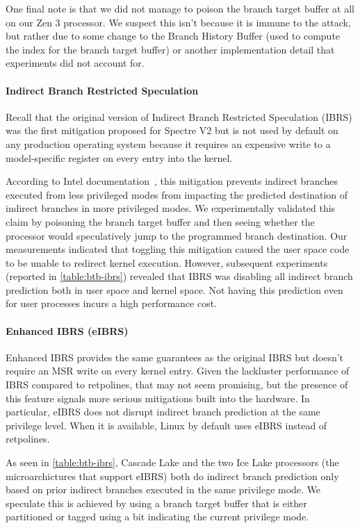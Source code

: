 One final note is that we did not manage to poison the branch target buffer at all on our Zen 3 processor.
We suspect this isn't because it is immune to the attack, but rather due to some change to the Branch History Buffer (used to compute the index for the branch target buffer) or another implementation detail that experiments did not account for.

\paragraph{Indirect Branch Restricted Speculation}

Recall that the original version of Indirect Branch Restricted Speculation (IBRS) was the first mitigation proposed for Spectre V2 but is not used by default on any production operating system because it requires an expensive write to a model-specific register on every entry into the kernel.

According to Intel documentation~\cite{intel:ibrs-ssbd}, this mitigation prevents indirect branches executed from less privileged modes from impacting the predicted destination of indirect branches in more privileged modes.
We experimentally validated this claim by poisoning the branch target buffer and then seeing whether the processor would speculatively jump to the programmed branch destination.
Our measurements indicated that toggling this mitigation caused the
user space code to be unable to redirect kernel execution.
However, subsequent experiments (reported in
\autoref{table:btb-ibrs}) revealed that IBRS was disabling all
indirect branch prediction both in user space and kernel space.
Not having this prediction even for user processes incurs a high performance cost.

\paragraph{Enhanced IBRS (eIBRS)}

Enhanced IBRS provides the same guarantees as the original IBRS but doesn't require an MSR write on every kernel entry.
Given the lackluster performance of IBRS compared to retpolines, that may not seem promising, but the presence of this feature signals more serious mitigations built into the hardware.
In particular, eIBRS does not disrupt indirect branch prediction at the same privilege level.
When it is available, Linux by default uses eIBRS instead of retpolines.

As seen in \autoref{table:btb-ibrs}, Cascade Lake and the two Ice Lake
processors (the microarchictures that support eIBRS) both do indirect branch prediction only based on prior indirect branches executed in the same privilege mode.
We speculate this is achieved by using a branch target buffer that is either partitioned or tagged using a bit indicating the current privilege mode.

